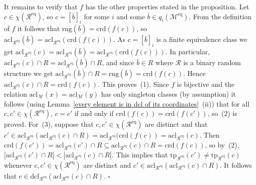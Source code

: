 \documentclass[11pt, twoside]{amsart}
\numberwithin{equation}{section}
\newcommand{\tp}{\mathrm{tp}}
\newcommand{\acl}{\mathrm{acl}}
\newcommand{\dcl}{\mathrm{dcl}}
\newcommand{\crd}{\mathrm{crd}}
\newcommand{\meq}{^{\mathrm{eq}}}
\newcommand{\mcM}{\mathcal{M}}
\newcommand{\mcR}{\mathcal{R}}
\newcommand{\rng}{\mathrm{rng}}
\begin{document}
It remains to verify that $f$ has the other properties stated in the proposition.
Let $c \in \chi(\mcR\meq)$, so $c = [\bar{b}]_i$ for some $i$ and some $\bar{b} \in q_i(\mcM\meq)$.
From the definition of $f$ it follows that $\rng(\bar{b}) = \crd(f(c))$, so $\acl_{\mcR\meq}(\bar{b}) = \acl_{\mcR\meq}(\crd(f(c)))$.
As $c = [\bar{b}]_i$ is a finite equivalence class we get
$\acl_{\mcR\meq}(c) = \acl_{\mcR\meq}(\bar{b}) = \acl_{\mcR\meq}(\crd(f(c)))$.
In particular,
$\acl_{\mcR\meq}(c)  \cap R = \acl_{\mcR\meq}(\bar{b}) \cap R$, and since $\bar{b} \in R$ where
$\mcR$ is a binary random structure we get $\acl_{\mcR\meq}(\bar{b}) \cap R = \rng(\bar{b}) = \crd(f(c))$.
Hence $\acl_{\mcR\meq}(c) \cap R = \crd(f(c))$. This proves~(1).
Since $f$ is bijective and the relation $\acl_\mcM(x) = \acl_\mcM(y)$ has only singleton classes (by assumption) it follows 
(using Lemma~\ref{every element is in dcl of its coordinates}~(ii)) that
for all $c, c' \in \chi(\mcR\meq)$, $c = c'$ if and only if $\crd(f(c)) = \crd(f(c'))$, so~(2) is proved.
For~(3), suppose that $c, c' \in \chi(\mcR\meq)$ are distinct and that $c' \in \acl_{\mcR\meq}(\acl_{\mcR\meq}(c) \cap R) =
\acl_{\mcR\meq}(\crd(f(c)) = \acl_{\mcR\meq}(c)$. Then $\crd(f(c')) = \acl_{\mcR\meq}(c') \cap R \subseteq 
\acl_{\mcR\meq}(c) \cap R = \crd(f(c))$, so by~(2), $|\acl_{\mcR\meq}(c') \cap R| < |\acl_{\mcR\meq}(c) \cap R|$. 
This implies that $\tp_{\mcR\meq}(c') \neq \tp_{\mcR\meq}(c)$ whenever 
$c, c' \in \chi(\mcR\meq)$ are distinct and $c' \in \acl_{\mcR\meq}(\acl_{\mcR\meq}(c) \cap R)$.
It follows that $c \in \dcl_{\mcR\meq}(\acl_{\mcR\meq}(c) \cap R)$.
\hfill $\square$
\\
\end{document}
